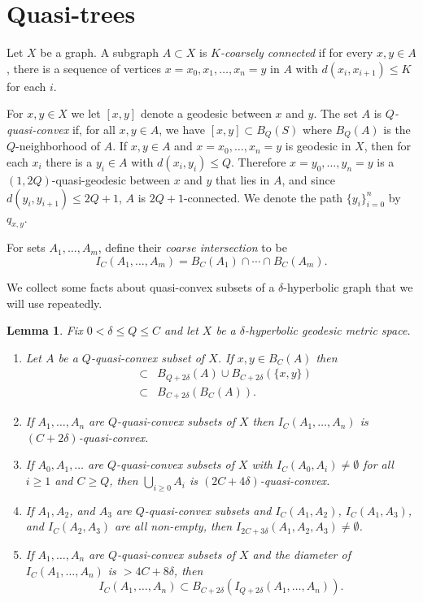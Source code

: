 \documentclass[11pt]{article}
\newtheorem{lemma}[thm]{Lemma}
\theoremstyle{remark}
\begin{document}
\section{Quasi-trees}
Let $X$ be a graph. A subgraph $A \subset X$ is
 \emph{$K$-coarsely connected} if for every $x,y\in A$, there is a
sequence of vertices $x=x_0,x_1,\ldots,x_n=y$ in $A$ with $d(x_i,x_{i+1})\leq K$ for each $i$.

For $x,y \in X$ we let $[x,y]$ denote a geodesic between $x$ and $y$. The set $A$ is {\em $Q$-quasi-convex} if, for all $x, y \in A$, we have $[x,y] \subset B_Q(S)$ where $B_Q(A)$ is the $Q$-neighborhood of $A$.
If $x,y \in A$ and $x = x_0, \dots, x_n =y$ is geodesic in $X$, then for each $x_i$ there is a $y_i \in A$ with $d(x_i, y_i) \le Q$. Therefore $x= y_0, \dots, y_n = y$ is a $(1, 2Q)$-quasi-geodesic between $x$ and $y$ that lies in $A$, and since $d(y_i, y_{i+1}) \le 2Q+1$, $A$ is $2Q+1$-connected. We denote the path $\{y_i\}_{i=0}^n$ by $q_{x,y}$.

For sets $A_1, \dots, A_m$, define their {\em coarse intersection} to be
$$I_C(A_1, \dots, A_m) = B_C(A_1) \cap \cdots \cap B_C(A_m).$$

We collect some facts about quasi-convex subsets of a $\delta$-hyperbolic graph that we will use repeatedly.

\begin{lemma}\label{fellow travel}
Fix $0<\delta\le Q \le C$ and let $X$ be a $\delta$-hyperbolic geodesic metric space.
\begin{enumerate}
\item Let $A$ be a $Q$-quasi-convex subset of $X$. If $x,y \in B_C(A)$ then 
\begin{eqnarray*}
[x,y] &\subset & B_{Q+2\delta}(A) \cup B_{C+2\delta}(\{x,y\})\\  & \subset & B_{C+2\delta}(B_C(A)).
\end{eqnarray*}

\item\label{intersection quasiconvex} If $A_1, \dots, A_n$ are $Q$-quasi-convex subsets of $X$  then $I_C(A_1, \dots, A_n)$ is $(C+2\delta)$-quasi-convex.

\item\label{union quasiconvex} If $A_0, A_1, \dots$ are $Q$-quasi-convex subsets of $X$ with $I_C(A_0, A_i) \neq \emptyset$ for all $i\ge 1$ and $C\ge Q$, then $\bigcup_{i\ge 0} A_i$ is $(2C+4\delta)$-quasi-convex.

\item\label{triple} If $A_1, A_2$, and $A_3$ are $Q$-quasi-convex subsets and $I_C(A_1, A_2)$, $I_C(A_1, A_3)$, and $I_C(A_2, A_3)$ are all non-empty, then $I_{2C+3\delta}(A_1, A_2, A_3) \neq \emptyset$.

\item\label{larger}  If $A_1, \dots, A_n$ are $Q$-quasi-convex subsets of $X$ and the diameter of $I_C(A_1, \dots, A_n)$ is $> 4C + 8\delta$, then
$$I_C(A_1, \dots, A_n) \subset B_{C+2\delta}(I_{Q+2\delta}(A_1, \dots, A_n)).$$
\end{enumerate}
\end{lemma}
\end{document}
